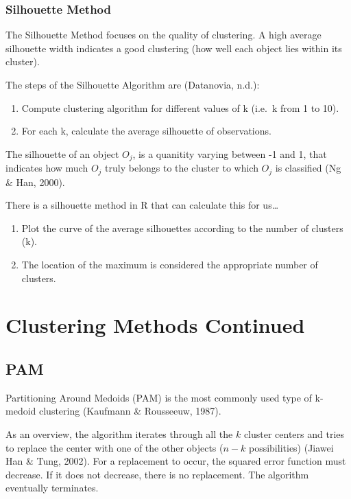 \documentclass[12pt,twoside]{amherstthesis}
\providecommand{\tightlist}{%
  \setlength{\itemsep}{0pt}\setlength{\parskip}{0pt}}
\begin{document}
  \subsection{Silhouette Method}\label{silhouette-method}
  
  The Silhouette Method focuses on the quality of clustering. A high
  average silhouette width indicates a good clustering (how well each
  object lies within its cluster).
  
  The steps of the Silhouette Algorithm are (Datanovia, n.d.):
  
  \begin{enumerate}
  \def\labelenumi{\arabic{enumi}.}
  \tightlist
  \item
    Compute clustering algorithm for different values of k (i.e.~k from 1
    to 10).
  \item
    For each k, calculate the average silhouette of observations.
  \end{enumerate}
  
  The silhouette of an object \(O_j\), is a quanitity varying between -1
  and 1, that indicates how much \(O_j\) truly belongs to the cluster to
  which \(O_j\) is classified (Ng \& Han, 2000).
  
  There is a silhouette method in R that can calculate this for us\ldots{}
  
  \begin{enumerate}
  \def\labelenumi{\arabic{enumi}.}
  \setcounter{enumi}{2}
  \tightlist
  \item
    Plot the curve of the average silhouettes according to the number of
    clusters (k).
  \item
    The location of the maximum is considered the appropriate number of
    clusters.
  \end{enumerate}
  
  \chapter{Clustering Methods Continued}\label{typeset-equ}
  
  \section{PAM}\label{pam}
  
  Partitioning Around Medoids (PAM) is the most commonly used type of
  k-medoid clustering (Kaufmann \& Rousseeuw, 1987).
  
  As an overview, the algorithm iterates through all the \(k\) cluster
  centers and tries to replace the center with one of the other objects
  (\(n-k\) possibilities) (Jiawei Han \& Tung, 2002). For a replacement to
  occur, the squared error function must decrease. If it does not
  decrease, there is no replacement. The algorithm eventually terminates.
  
\end{document}
